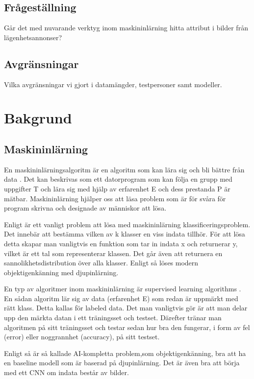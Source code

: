 \documentclass{kththesis}
\begin{document}
  \section{Frågeställning}
  Går det med nuvarande verktyg inom maskininlärning hitta attribut i bilder från lägenhetsannonser?


  \section{Avgränsningar}
  Vilka avgränsningar vi gjort i datamängder, testpersoner samt modeller.

\chapter{Bakgrund}
  \section{Maskininlärning}
  En maskininlärningsalgoritm är en algoritm som kan lära sig och bli bättre från data \parencite{Goodfellow-et-al-2016}. Det kan beskrivas som ett datorprogram som kan följa en grupp med uppgifter T och lära sig med hjälp av erfarenhet E och dess prestanda P är mätbar. Maskininlärning hjälper oss att läsa problem som är för svåra för program skrivna och designade av människor att lösa. 

  Enligt \cite{Goodfellow-et-al-2016} är ett vanligt problem att lösa med maskininlärning klassificeringsproblem. Det innebär att bestämma vilken av k klasser en viss indata tillhör. För att lösa detta skapar man vanligtvis en funktion som tar in indata x och returnerar y, vilket är ett tal som representerar klassen. Det går även att returnera en sannolikhetsdistribution över alla klasser. Enligt \cite{Goodfellow-et-al-2016} så löses modern objektigenkänning med djupinlärning.

  En typ av algoritmer inom maskininlärning är supervised learning algorithms \parencite{Goodfellow-et-al-2016}. En sådan algoritm lär sig av data (erfarenhet E) som redan är uppmärkt med rätt klass. Detta kallas för labeled data. Det man vanligtvis gör är att man delar upp den märkta datan i ett träningsset och testset. Därefter tränar man algoritmen på sitt träningsset och testar sedan hur bra den fungerar, i form av fel (error) eller noggrannhet (accuracy), på sitt testset.

  Enligt \parencite{Goodfellow-et-al-2016} så är så kallade AI-kompletta problem,som objektigenkänning, bra att ha en baseline modell som är baserad på djupinlärning. Det är även bra att börja med ett CNN om indata består av bilder. 
\end{document}
